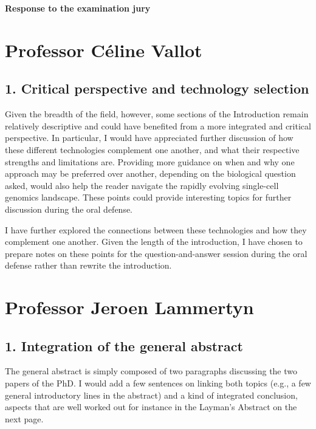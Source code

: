 \documentclass[11pt,a4paper]{article}
\begin{document}
{\LARGE\sffamily\bfseries\color{heading}Response to the examination jury\par}

\section*{\sffamily\color{heading}Professor Céline Vallot}

\subsection*{\sffamily\color{heading}1. Critical perspective and technology selection}

\begin{reviewcomment}
Given the breadth of the field, however, some sections of the Introduction remain relatively descriptive and could have benefited from a more integrated and critical perspective. In particular, I would have appreciated further discussion of how these different technologies complement one another, and what their respective strengths and limitations are. Providing more guidance on when and why one approach may be preferred over another, depending on the biological question asked, would also help the reader navigate the rapidly evolving single-cell genomics landscape. These points could provide interesting topics for further discussion during the oral defense.
\end{reviewcomment}

I have further explored the connections between these technologies and how they complement one another. Given the length of the introduction, I have chosen to prepare notes on these points for the question-and-answer session during the oral defense rather than rewrite the introduction.

\section*{\sffamily\color{heading}Professor Jeroen Lammertyn}

\subsection*{\sffamily\color{heading}1. Integration of the general abstract}

\begin{reviewcomment}
The general abstract is simply composed of two paragraphs discussing the two papers of the PhD. I would add a few sentences on linking both topics (e.g., a few general introductory lines in the abstract) and a kind of integrated conclusion, aspects that are well worked out for instance in the Layman's Abstract on the next page.
\end{reviewcomment}
\end{document}
